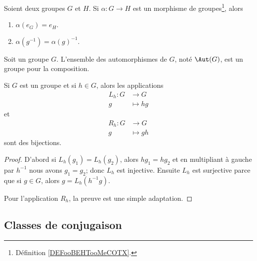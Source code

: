 \begin{lemma}       \label{LEMooWYLRooNOdZnp}
    Soient deux groupes \( G\) et \( H\). Si \( \alpha\colon G\to H\) est un morphisme de groupes\footnote{Définition \ref{DEFooBEHTooMeCOTX}.}, alors
    \begin{enumerate}
        \item
            \( \alpha(e_G)=e_H\).
        \item
            \( \alpha(g^{-1})=\alpha(g)^{-1}\).
    \end{enumerate}
\end{lemma}

\begin{lemmaDef}        \label{LEMooSQQDooCmOvqi}
    Soit un groupe \( G\). L'ensemble des automorphismes de \( G\), noté \( \Aut(G)\), est un groupe pour la composition.
\end{lemmaDef}


\begin{lemma}       \label{LEMooBIBFooBHxFYC}
    Si \( G\) est un groupe et si \( h\in G\), alors les applications
    \begin{equation}
        \begin{aligned}
            L_h\colon G&\to G \\
            g&\mapsto hg 
        \end{aligned}
    \end{equation}
    et
    \begin{equation}
        \begin{aligned}
            R_h\colon G&\to G \\
            g&\mapsto gh 
        \end{aligned}
    \end{equation}
    sont des bijections.
\end{lemma}

\begin{proof}
    D'abord si \( L_h(g_1)=L_h(g_2)\), alors \( hg_1=hg_2\) et en multipliant à gauche par \( h^{-1}\) nous avons \( g_1=g_2\); donc \( L_h\) est injective. Ensuite \( L_h\) est surjective parce que si \( g\in G\), alors \( g=L_h(h^{-1} g)\).

    Pour l'application \( R_h\), la preuve est une simple adaptation.
\end{proof}

\subsection{Classes de conjugaison}

